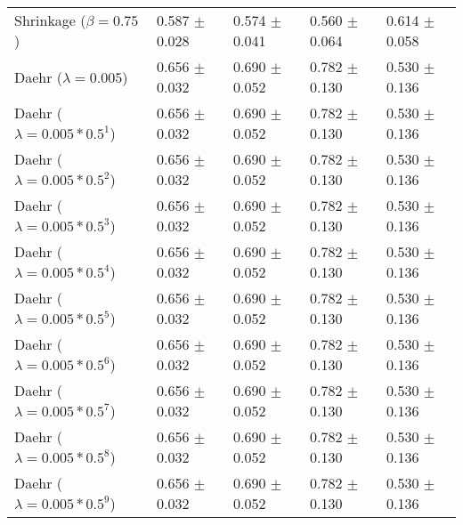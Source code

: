 \begin{table}
\begin{tabular}{*{5}{l}}
Shrinkage ($\beta=0.75$)&0.587 $\pm$ 0.028&0.574 $\pm$ 0.041&0.560 $\pm$ 0.064&0.614 $\pm$ 0.058\\
Daehr ($\lambda=0.005$)&0.656 $\pm$ 0.032&0.690 $\pm$ 0.052&0.782 $\pm$ 0.130&0.530 $\pm$ 0.136\\
Daehr ($\lambda=0.005*0.5^1$)&0.656 $\pm$ 0.032&0.690 $\pm$ 0.052&0.782 $\pm$ 0.130&0.530 $\pm$ 0.136\\
Daehr ($\lambda=0.005*0.5^2$)&0.656 $\pm$ 0.032&0.690 $\pm$ 0.052&0.782 $\pm$ 0.130&0.530 $\pm$ 0.136\\
Daehr ($\lambda=0.005*0.5^3$)&0.656 $\pm$ 0.032&0.690 $\pm$ 0.052&0.782 $\pm$ 0.130&0.530 $\pm$ 0.136\\
Daehr ($\lambda=0.005*0.5^4$)&0.656 $\pm$ 0.032&0.690 $\pm$ 0.052&0.782 $\pm$ 0.130&0.530 $\pm$ 0.136\\
Daehr ($\lambda=0.005*0.5^5$)&0.656 $\pm$ 0.032&0.690 $\pm$ 0.052&0.782 $\pm$ 0.130&0.530 $\pm$ 0.136\\
Daehr ($\lambda=0.005*0.5^6$)&0.656 $\pm$ 0.032&0.690 $\pm$ 0.052&0.782 $\pm$ 0.130&0.530 $\pm$ 0.136\\
Daehr ($\lambda=0.005*0.5^7$)&0.656 $\pm$ 0.032&0.690 $\pm$ 0.052&0.782 $\pm$ 0.130&0.530 $\pm$ 0.136\\
Daehr ($\lambda=0.005*0.5^8$)&0.656 $\pm$ 0.032&0.690 $\pm$ 0.052&0.782 $\pm$ 0.130&0.530 $\pm$ 0.136\\
Daehr ($\lambda=0.005*0.5^9$)&0.656 $\pm$ 0.032&0.690 $\pm$ 0.052&0.782 $\pm$ 0.130&0.530 $\pm$ 0.136\\
\bottomrule
\end{tabular}
\end{table}


